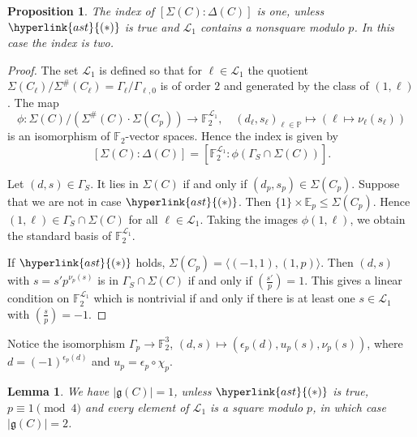 \documentclass{amsart}
\theoremstyle{definition}
\theoremstyle{plain}
\newtheorem{lemma}[definition]{Lemma}
\newtheorem{proposition}[definition]{Proposition}
\newcommand{\FF}{\mathbb{F}}
\newcommand{\PP}{\mathbb{P}}
\newcommand{\EE}{\mathbb{E}}
\newcommand{\condAst}{\hyperlink{ast}{(\ast)}}
\begin{document}
\begin{proposition}
The index of $[\Sigma(C) : \Delta(C)]$ is one, unless $\condAst$ is true and $\mathcal{L}_1$
 contains a nonsquare modulo $p$. In this case the index is two.
\end{proposition}
\begin{proof}
The set $\mathcal{L}_1$ is defined so that for $\ell \in \mathcal{L}_1$ the quotient $\Sigma(C_\ell)/\Sigma^\#(C_\ell) = \Gamma_{\ell}/\Gamma_{\ell,0}$ is of order $2$ and generated by the class of $(1,\ell)$.
The map
\[\phi\colon \Sigma(C)/\left(\Sigma^\#(C)\cdot \Sigma(C_p)\right) \longrightarrow \FF_2^{\mathcal{L}_1}, \quad(d_\ell,s_\ell)_{\ell \in \PP} \mapsto (\ell \mapsto \nu_\ell(s_\ell))\]
is an isomorphism of $\FF_2$-vector spaces.
Hence the index is given by \[[\Sigma(C) : \Delta(C)]=[\FF_2^{\mathcal{L}_1} : \phi(\Gamma_S \cap \Sigma(C))].\]

Let $(d,s) \in \Gamma_S$. It lies in $\Sigma(C)$ if and only if $(d_p,s_p) \in \Sigma(C_p)$.
Suppose that we are not in case $\condAst$. Then $\{1\} \times \EE_p \leq \Sigma(C_p)$. Hence $(1,\ell) \in \Gamma_S \cap \Sigma(C)$ for all $\ell \in {\mathcal{L}_1}$. Taking the images $\phi(1,\ell)$, we obtain the standard basis of $\FF_2^{\mathcal{L}_1}$.

If $\condAst$ holds, $\Sigma(C_p)=\langle (-1,1),(1,p)\rangle$.
Then $(d,s)$ with $s=s'p^{\nu_p(s)}$ is in $\Gamma_S \cap \Sigma(C)$
if and only if $\left(\frac{s'}{p}\right)=1$.
This gives a linear condition on $\FF_2^{{\mathcal{L}_1}}$ which is
nontrivial if and only if there is at least one $s \in {\mathcal{L}_1}$ with $\left(\frac{s}{p}\right)=-1$.
\end{proof}
Notice the isomorphism
$\Gamma_p \rightarrow \FF_2^3$, $(d,s) \mapsto (\epsilon_p(d),u_p(s),\nu_p(s))$, where $d=(-1)^{\epsilon_p(d)}$ and $u_p = \epsilon_p\circ \chi_p$.
\begin{lemma}
 We have $|\mathfrak{g}(C)|=1$, unless $\condAst$ is true,
 $p \equiv 1 \pmod 4$ and
 every element of ${\mathcal{L}_1}$ is a square modulo $p$,
 in which case $|\mathfrak{g}(C)|=2$.
\end{lemma}
\end{document}
